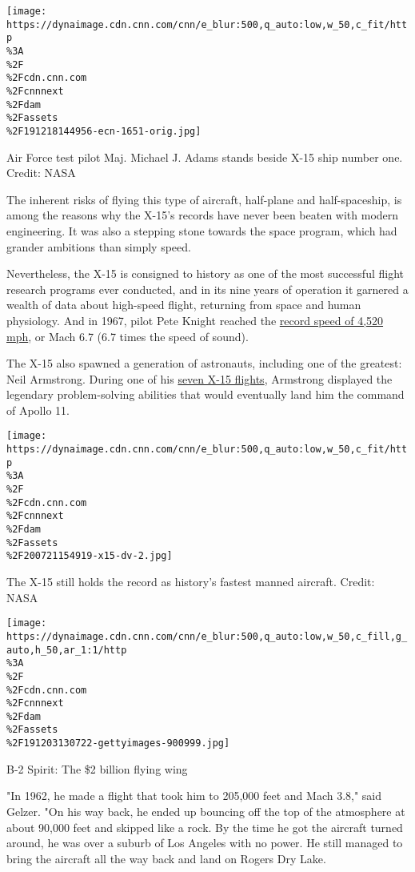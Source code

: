 \texttt{[image: https://dynaimage.cdn.cnn.com/cnn/e\_blur:500,q\_auto:low,w\_50,c\_fit/http\\\%3A\\\%2F\\\%2Fcdn.cnn.com\\\%2Fcnnnext\\\%2Fdam\\\%2Fassets\\\%2F191218144956-ecn-1651-orig.jpg]}

Air Force test pilot Maj. Michael J. Adams stands beside X-15 ship
number one. Credit: NASA

The inherent risks of flying this type of aircraft, half-plane and
half-spaceship, is among the reasons why the X-15's records have never
been beaten with modern engineering. It was also a stepping stone
towards the space program, which had grander ambitions than simply
speed.

Nevertheless, the X-15 is consigned to history as one of the most
successful flight research programs ever conducted, and in its nine
years of operation it garnered a wealth of data about high-speed flight,
returning from space and human physiology. And in 1967, pilot Pete
Knight reached the
\href{https://www.nasa.gov/centers/armstrong/news/FactSheets/FS-052-DFRC.html}{record
speed of 4,520 mph}, or Mach 6.7 (6.7 times the speed of sound).

The X-15 also spawned a generation of astronauts, including one of the
greatest: Neil Armstrong. During one of his
\href{https://www.nasa.gov/centers/dryden/multimedia/imagegallery/X-15/E-USAF-Armstrong-X-15.html}{seven
X-15 flights}, Armstrong displayed the legendary problem-solving
abilities that would eventually land him the command of Apollo 11.

\texttt{[image: https://dynaimage.cdn.cnn.com/cnn/e\_blur:500,q\_auto:low,w\_50,c\_fit/http\\\%3A\\\%2F\\\%2Fcdn.cnn.com\\\%2Fcnnnext\\\%2Fdam\\\%2Fassets\\\%2F200721154919-x15-dv-2.jpg]}

The X-15 still holds the record as history's fastest manned aircraft.
Credit: NASA

\href{/style/article/b-2-spirit-stealth-bomber/index.html}{}

\texttt{[image: https://dynaimage.cdn.cnn.com/cnn/e\_blur:500,q\_auto:low,w\_50,c\_fill,g\_auto,h\_50,ar\_1:1/http\\\%3A\\\%2F\\\%2Fcdn.cnn.com\\\%2Fcnnnext\\\%2Fdam\\\%2Fassets\\\%2F191203130722-gettyimages-900999.jpg]}

B-2 Spirit: The \$2 billion flying wing

"In 1962, he made a flight that took him to 205,000 feet and Mach 3.8,"
said Gelzer. "On his way back, he ended up bouncing off the top of the
atmosphere at about 90,000 feet and skipped like a rock. By the time he
got the aircraft turned around, he was over a suburb of Los Angeles with
no power. He still managed to bring the aircraft all the way back and
land on Rogers Dry Lake.

